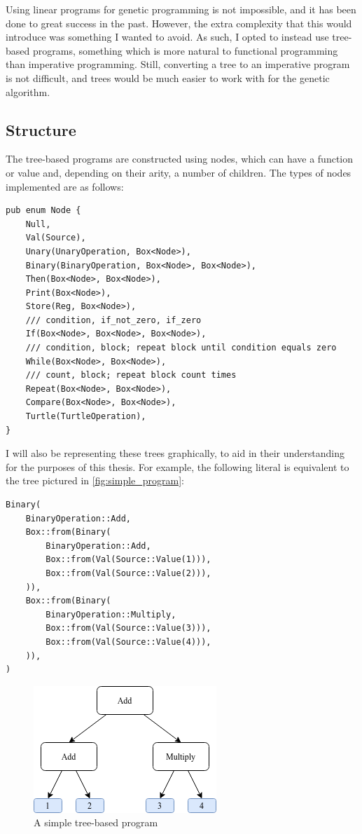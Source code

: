 \documentclass{report}
\begin{document}
Using linear programs for genetic programming is not impossible, and it has been done to great success in the past. However, the extra complexity that this would introduce was something I wanted to avoid. As such, I opted to instead use tree-based programs, something which is more natural to functional programming than imperative programming. Still, converting a tree to an imperative program is not difficult, and trees would be much easier to work with for the genetic algorithm.

\subsection{Structure}
The tree-based programs are constructed using nodes, which can have a function or value and, depending on their arity, a number of children. The types of nodes implemented are as follows:

\begin{verbatim}
pub enum Node {
    Null,
    Val(Source),
    Unary(UnaryOperation, Box<Node>),
    Binary(BinaryOperation, Box<Node>, Box<Node>),
    Then(Box<Node>, Box<Node>),
    Print(Box<Node>),
    Store(Reg, Box<Node>),
    /// condition, if_not_zero, if_zero
    If(Box<Node>, Box<Node>, Box<Node>),
    /// condition, block; repeat block until condition equals zero
    While(Box<Node>, Box<Node>),
    /// count, block; repeat block count times
    Repeat(Box<Node>, Box<Node>),
    Compare(Box<Node>, Box<Node>),
    Turtle(TurtleOperation),
}
\end{verbatim}

I will also be representing these trees graphically, to aid in their understanding for the purposes of this thesis. For example, the following literal is equivalent to the tree pictured in \autoref{fig:simple_program}:
\begin{verbatim}
Binary(
    BinaryOperation::Add,
    Box::from(Binary(
        BinaryOperation::Add,
        Box::from(Val(Source::Value(1))),
        Box::from(Val(Source::Value(2))),
    )),
    Box::from(Binary(
        BinaryOperation::Multiply,
        Box::from(Val(Source::Value(3))),
        Box::from(Val(Source::Value(4))),
    )),
)
\end{verbatim}

\begin{figure}[ht]
    \centering
    \includegraphics[scale=0.75]{tree_1}
    \caption{A simple tree-based program}
    \label{fig:simple_program}
\end{figure}
\end{document}
